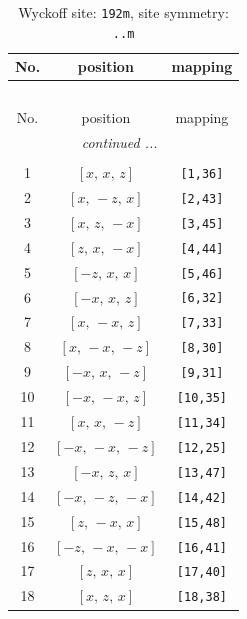 \documentclass[fleqn,8pt]{jsarticle}
\begin{document}
\begin{longtable}{ccc}
\caption{Wyckoff site: {\tt 192m}, site symmetry: {\tt ..m}}
 \\
 \hline \hline
No. & position & mapping \\ \hline \endfirsthead

\multicolumn{2}{l}{\tablename\ \thetable{}} \\
 \hline \hline
No. & position & mapping \\ \hline \endhead

 \hline \hline
\multicolumn{2}{r}{\footnotesize\it continued ...} \\ \endfoot

 \hline \hline
\multicolumn{2}{r}{} \\ \endlastfoot

1 & $\left[ x,\, x,\, z \right]$ & {\tt [1,36]} \\ \hline
2 & $\left[ x,\, - z,\, x \right]$ & {\tt [2,43]} \\ \hline
3 & $\left[ x,\, z,\, - x \right]$ & {\tt [3,45]} \\ \hline
4 & $\left[ z,\, x,\, - x \right]$ & {\tt [4,44]} \\ \hline
5 & $\left[ - z,\, x,\, x \right]$ & {\tt [5,46]} \\ \hline
6 & $\left[ - x,\, x,\, z \right]$ & {\tt [6,32]} \\ \hline
7 & $\left[ x,\, - x,\, z \right]$ & {\tt [7,33]} \\ \hline
8 & $\left[ x,\, - x,\, - z \right]$ & {\tt [8,30]} \\ \hline
9 & $\left[ - x,\, x,\, - z \right]$ & {\tt [9,31]} \\ \hline
10 & $\left[ - x,\, - x,\, z \right]$ & {\tt [10,35]} \\ \hline
11 & $\left[ x,\, x,\, - z \right]$ & {\tt [11,34]} \\ \hline
12 & $\left[ - x,\, - x,\, - z \right]$ & {\tt [12,25]} \\ \hline
13 & $\left[ - x,\, z,\, x \right]$ & {\tt [13,47]} \\ \hline
14 & $\left[ - x,\, - z,\, - x \right]$ & {\tt [14,42]} \\ \hline
15 & $\left[ z,\, - x,\, x \right]$ & {\tt [15,48]} \\ \hline
16 & $\left[ - z,\, - x,\, - x \right]$ & {\tt [16,41]} \\ \hline
17 & $\left[ z,\, x,\, x \right]$ & {\tt [17,40]} \\ \hline
18 & $\left[ x,\, z,\, x \right]$ & {\tt [18,38]} \\ \hline

\end{longtable}
\end{document}
